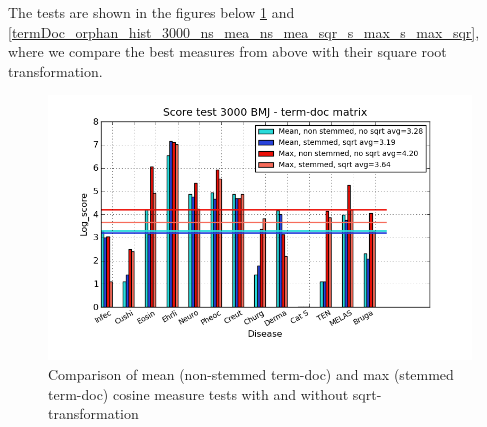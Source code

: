 The tests are shown in the figures below \ref{termDoc_bmj_hist_3000_ns_mea_ns_mea_sqr_s_max_s_max_sqr} and \ref{termDoc_orphan_hist_3000_ns_mea_ns_mea_sqr_s_max_s_max_sqr}, where we compare the best measures from above 
with their square root transformation.

\begin{figure}[H]
  \caption{Comparison of mean (non-stemmed term-doc) and max (stemmed term-doc) cosine measure tests with and without sqrt-transformation}
  \begin{center}
    \includegraphics[width=1.2\textwidth]{barcharts/termDoc_bmj_hist_3000_ns_mea_ns_mea_sqr_s_max_s_max_sqr.png}
  \end{center}
  \label{termDoc_bmj_hist_3000_ns_mea_ns_mea_sqr_s_max_s_max_sqr}
\end{figure}

